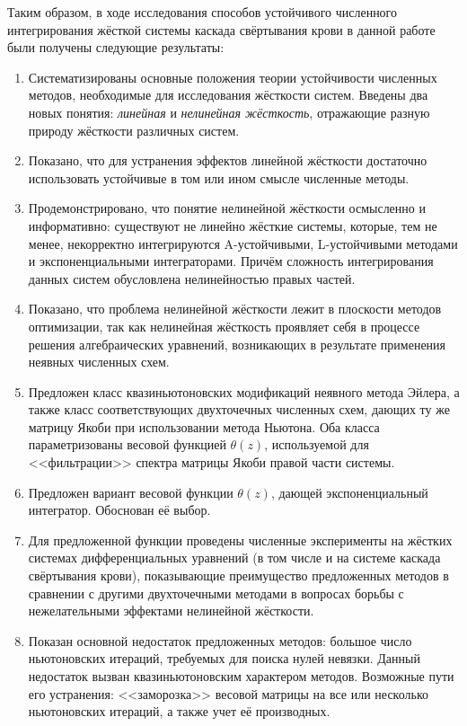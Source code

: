 Таким образом, в ходе исследования способов устойчивого численного интегрирования жёсткой системы каскада свёртывания крови
в данной работе были получены следующие результаты:
\begin{enumerate}
    \item
        Систематизированы основные положения теории устойчивости численных методов,
        необходимые для исследования жёсткости систем.
        Введены два новых понятия: \emph{линейная} и \emph{нелинейная жёсткость},
        отражающие разную природу жёсткости различных систем.
    \item
        Показано, что для устранения эффектов линейной жёсткости достаточно использовать
        устойчивые в том или ином смысле численные методы.
    \item
        Продемонстрировано, что понятие нелинейной жёсткости осмысленно и информативно:
        существуют не линейно жёсткие системы, которые, тем не менее,
        некорректно интегрируются A-устойчивыми, L-устойчивыми методами и экспоненциальными интеграторами.
        Причём сложность интегрирования данных систем обусловлена нелинейностью правых частей.
    \item
        Показано, что проблема нелинейной жёсткости лежит в плоскости методов оптимизации,
        так как нелинейная жёсткость проявляет себя в процессе решения алгебраических уравнений,
        возникающих в результате применения неявных численных схем.
    \item
        Предложен класс квазиньютоновских модификаций неявного метода Эйлера,
        а также класс соответствующих двухточечных численных схем,
        дающих ту же матрицу Якоби при использовании метода Ньютона.
        Оба класса параметризованы весовой функцией $ \theta(z) $,
        используемой для <<фильтрации>> спектра матрицы Якоби правой части системы.
    \item
        Предложен вариант весовой функции $ \theta(z) $,
        дающей экспоненциальный интегратор.
        Обоснован её выбор.
    \item
        Для предложенной функции проведены численные эксперименты на жёстких системах
        дифференциальных уравнений (в том числе и на системе каскада свёртывания крови),
        показывающие преимущество предложенных методов в сравнении с другими двухточечными методами
        в вопросах борьбы с нежелательными эффектами нелинейной жёсткости.
    \item
        Показан основной недостаток предложенных методов:
        большое число ньютоновских итераций, требуемых для поиска нулей невязки.
        Данный недостаток вызван квазиньютоновским характером методов.
        Возможные пути его устранения: <<заморозка>> весовой матрицы на все или несколько ньютоновских итераций,
        а также учет её производных.
\end{enumerate}
